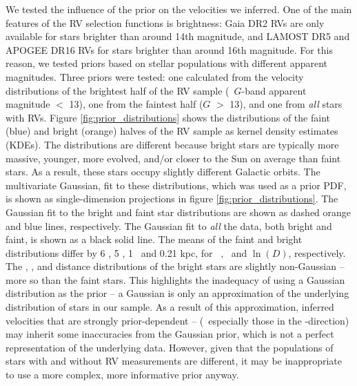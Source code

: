 We tested the influence of the prior on the velocities we inferred.
One of the main features of the RV selection functions is brightness: Gaia DR2
RVs are only available for stars brighter than around 14th magnitude, and
LAMOST DR5 and APOGEE DR16 RVs for stars brighter than around 16th magnitude.
For this reason, we tested priors based on stellar populations with different
apparent magnitudes.
Three priors were tested: one calculated from the velocity distributions of
the brightest half of the RV sample (\gaia\ $G$-band apparent magnitude $<$
13), one from the faintest half ($G$ $>$ 13), and one from {\it all} stars
with RVs.
Figure \ref{fig:prior_distributions} shows the distributions of the faint
(blue) and bright (orange) halves of the RV sample as kernel density estimates
(KDEs).
The distributions are different because bright stars are typically more
massive, younger, more evolved, and/or closer to the Sun on average than faint
stars.
As a result, these stars occupy slightly different Galactic orbits.
The multivariate Gaussian, fit to these distributions, which was used as a
prior PDF, is shown as single-dimension projections in figure
\ref{fig:prior_distributions}.
The Gaussian fit to the bright and faint star distributions are shown as
dashed orange and blue lines, respectively.
The Gaussian fit to {\it all} the data, both bright and faint, is shown as a
black solid line.
The means of the faint and bright distributions differ by 6 \kms, 5 \kms, 1
\kms\ and 0.21 kpc, for \vx\, \vy, \vz\ and $\ln(D)$, respectively.
The \vx, \vy, and distance distributions of the bright stars are slightly
non-Gaussian -- more so than the faint stars.
This highlights the inadequacy of using a Gaussian distribution as the prior
-- a Gaussian is only an approximation of the underlying distribution of stars
in our sample.
As a result of this approximation, inferred velocities that are strongly
prior-dependent -- (\ie\ especially those in the \y-direction) may inherit
some inaccuracies from the Gaussian prior, which is not a perfect
representation of the underlying data.
However, given that the populations of stars with and without RV measurements
are different, it may be inappropriate to use a more complex, more
informative prior anyway.

